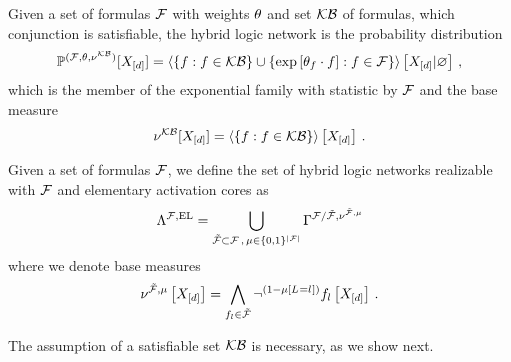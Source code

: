 \begin{definition}\label{def:hln}
	Given a set of formulas $\mathcal{F}$ with weights $\theta$ and set $\mathcal{KB}$ of formulas, which conjunction is satisfiable, the hybrid logic network is the probability distribution
	\begin{align*}
		\mathbb{P}^{(\mathcal{F},\theta,\nu^{\mathcal{KB}})}[X_{[d]}] 
		= \left\langle 
		\{f : f\in\mathcal{KB}\} \cup \{\mathrm{exp}\left[\theta_{f}\cdot f\right] : f\in\mathcal{F}\}
		\right\rangle \left[ X_{[d]} | \varnothing \right] \, ,
	\end{align*}
	which is the member of the exponential family with statistic by $\mathcal{F}$ and the base measure
		\[ \nu^{\mathcal{KB}}[X_{[d]}] = \left\langle \{f : f \in \mathcal{KB}\}\right\rangle \left[ X_{[d]} \right] \, .\]
		
	Given a set of formulas $\mathcal{F}$, we define the set of hybrid logic networks realizable with $\mathcal{F}$ and elementary activation cores as
	\begin{align*}
		\Lambda^{\mathcal{F},\mathrm{EL}} 
		= \bigcup_{\tilde{\mathcal{F}}\subset\mathcal{F} \, , \, \mu\in\{0,1\}^{\left|\mathcal{F}\right|}}
		\Gamma^{\mathcal{F}/\tilde{\mathcal{F}},\nu^{\tilde{\mathcal{F}},\mu}}
	\end{align*}
	where we denote base measures
	\begin{align*}
		\nu^{\tilde{\mathcal{F}},\mu}\left[X_{[d]}\right]
		= \bigwedge_{f_{l}\in\tilde{\mathcal{F}}} \lnot^{(1-\mu\left[L_{}=l_{}\right])} f_{l}\left[X_{[d]}\right] \, . 
	\end{align*}
\end{definition}

The assumption of a satisfiable set $\mathcal{KB}$ is necessary, as we show next.

